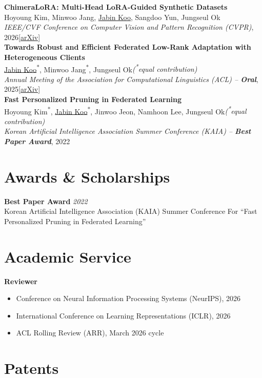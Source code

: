 \documentclass[11pt,a4paper]{article}
\newcommand{\entry}[4]{%
  \textbf{#1} \hfill \textit{#2}\\
  #3 \hfill #4\\[2pt]
}
\newcommand{\pub}[5]{%
  \textbf{#1}\\
  #2\\
  \textit{#3}, #4\quad\href{#5}{[arXiv]}\\[4pt]
}
\newcommand{\pubnolink}[4]{%
  \textbf{#1}\\
  #2\\
  \textit{#3}, #4\\[4pt]
}
\begin{document}
\pub{ChimeraLoRA: Multi-Head LoRA-Guided Synthetic Datasets}
{Hoyoung Kim, Minwoo Jang, \underline{Jabin Koo}, Sangdoo Yun, Jungseul Ok}
{IEEE/CVF Conference on Computer Vision and Pattern Recognition (CVPR)}{2026}
{https://arxiv.org/abs/2602.19708}

\pub{Towards Robust and Efficient Federated Low-Rank Adaptation with Heterogeneous Clients}
{\underline{Jabin Koo}\textsuperscript{*}, Minwoo Jang\textsuperscript{*}, Jungseul Ok\quad\textit{(\textsuperscript{*}equal contribution)}}
{Annual Meeting of the Association for Computational Linguistics (ACL) -- \textbf{Oral}}{2025}
{https://arxiv.org/abs/2410.22815}

\pubnolink{Fast Personalized Pruning in Federated Learning}
{Hoyoung Kim\textsuperscript{*}, \underline{Jabin Koo}\textsuperscript{*}, Jinwoo Jeon, Namhoon Lee, Jungseul Ok\quad\textit{(\textsuperscript{*}equal contribution)}}
{Korean Artificial Intelligence Association Summer Conference (KAIA) -- \textbf{Best Paper Award}}{2022}

\section*{Awards \& Scholarships}

\entry{Best Paper Award}{2022}
{Korean Artificial Intelligence Association (KAIA) Summer Conference}{For ``Fast Personalized Pruning in Federated Learning''}

\section*{Academic Service}
\textbf{Reviewer}
\begin{itemize}
  \item Conference on Neural Information Processing Systems (NeurIPS), 2026
  \item International Conference on Learning Representations (ICLR), 2026
  \item ACL Rolling Review (ARR), March 2026 cycle
\end{itemize}

\section*{Patents}
\end{document}
